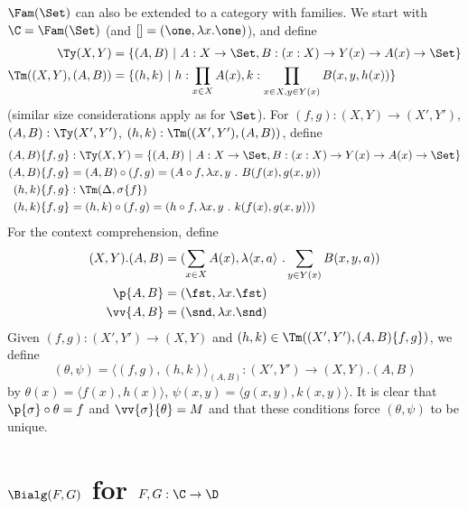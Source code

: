 \documentclass{article}
\begin{document}
$\Fam(\Set)$ can also be extended to a category with families. We
start with $\C = \Fam(\Set)$ (and $[] = (\one, \lambda x.\one)$), and define
\begin{align*}
  \Ty(X, Y) &= \{ (A, B)\ |\ A : X \to \Set, B : (x : X) \to Y(x) \to A(x) \to \Set\} \\
  \Tm((X, Y), (A, B)) &=  \{ (h, k)\ |\ h : \prod_{x \in X}A(x), k : \prod_{x \in X, y \in Y(x)}B(x, y, h(x))\}
\end{align*}
(similar size considerations apply as for $\Set$).
  For $(f, g) : (X, Y) \to (X', Y')$, $(A, B) :
\Ty(X', Y')$, $(h, k) : \Tm((X', Y'), (A, B))$, define
\begin{align*}
  (A, B)\{f, g\} &: \Ty(X, Y) = \{ (A, B)\ |\ A : X \to \Set, B : (x : X) \to Y(x) \to A(x) \to \Set\} \\
  (A, B)\{f, g\} &= (A, B) \circ (f, g) = (A \circ f, \lambda x, y\ .\ B(f(x), g(x, y)) \\
  (h, k)\{f, g\} &: \Tm(\Delta, \sigma\{f\}) \\
  (h, k)\{f, g\} &= (h, k) \circ (f, g) = (h \circ f, \lambda x, y\ .\ k(f(x), g(x, y)))
\end{align*}
For the context comprehension, define
\begin{align*}
  (X, Y).(A, B) &= (\sum_{x \in X}A(x), \lambda \langle x, a\rangle\ .\sum_{y \in Y(x)}B(x, y, a) ) \\
  \p{A, B} &= (\fst, \lambda x . \fst) \\
  \vv{A, B}&= (\snd, \lambda x . \snd)
\end{align*}
Given $(f, g) : (X', Y') \to (X, Y)$ and $(h, k) \in \Tm((X', Y'), (A, B)\{f, g\})$, we define
\[
(\theta, \psi) = \langle (f, g), (h, k)\rangle_{(A, B)} : (X', Y') \to (X, Y).(A, B)
\]
by $\theta(x) = \langle f(x), h(x)\rangle$, $\psi(x, y) = \langle g(x,
y), k(x, y)\rangle$. It is clear that $\p{\sigma} \circ \theta = f$
and $\vv{\sigma}\{\theta\} = M$ and that these conditions force
$(\theta, \psi)$ to be unique.





\section{$\Bialg(F, G)$ for $F, G : \C \to \D$}
\label{cwfDialg}



\end{document}
